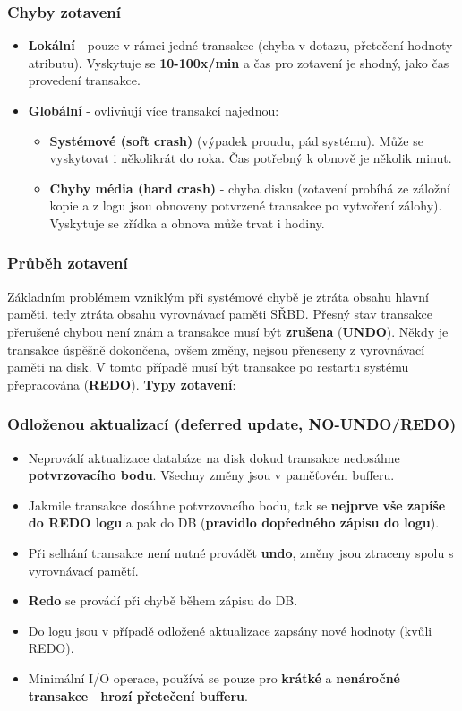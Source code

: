 \subsubsection{Chyby zotavení}
\begin{itemize}
\item\textbf{Lokální} - pouze v rámci jedné transakce (chyba v dotazu, přetečení hodnoty atributu). Vyskytuje se \textbf{10-100x/min} a čas pro zotavení je shodný, jako čas provedení transakce.
\item\textbf{Globální} - ovlivňují více transakcí najednou:
\begin{itemize}
\item\textbf{Systémové (soft crash)} (výpadek proudu, pád systému). Může se vyskytovat i několikrát do roka. Čas potřebný k obnově je několik minut.
\item\textbf{Chyby média (hard crash)} - chyba disku (zotavení probíhá ze záložní kopie a z logu jsou obnoveny potvrzené transakce po vytvoření zálohy). Vyskytuje se zřídka a obnova může trvat i hodiny.
\end{itemize}
\end{itemize}

\subsubsection{Průběh zotavení}
Základním problémem vzniklým při systémové chybě je ztráta obsahu hlavní paměti, tedy ztráta obsahu vyrovnávací paměti SŘBD. Přesný stav transakce přerušené chybou není znám a transakce musí být \textbf{zrušena} (\textbf{UNDO}). Někdy je transakce úspěšně dokončena, ovšem změny, nejsou přeneseny z vyrovnávací paměti na disk. V tomto případě musí být transakce po restartu systému přepracována (\textbf{REDO}). \textbf{Typy zotavení}: 

\subsubsection*{Odloženou aktualizací (deferred update, NO-UNDO/REDO)}
\begin{itemize}
\item Neprovádí aktualizace databáze na disk dokud transakce nedosáhne\textbf{ potvrzovacího bodu}. Všechny změny jsou v paměťovém bufferu.
\item Jakmile transakce dosáhne potvrzovacího bodu, tak se \textbf{nejprve vše zapíše do REDO logu} a pak do DB (\textbf{pravidlo dopředného zápisu do logu}).
\item Při selhání transakce není nutné provádět \textbf{undo}, změny jsou ztraceny spolu s vyrovnávací pamětí.
\item \textbf{Redo} se provádí při chybě během zápisu do DB.
\item Do logu jsou v případě odložené aktualizace zapsány nové hodnoty (kvůli REDO).
\item Minimální I/O operace, používá se pouze pro \textbf{krátké} a \textbf{nenáročné transakce} - \textbf{hrozí přetečení bufferu}.
\end{itemize}
